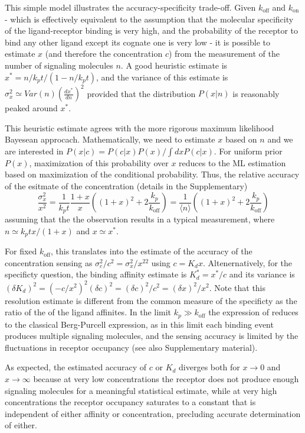 \documentclass[prl,showpacs]{revtex4}
\begin{document}
This simple model illustrates the accuracy-specificity trade-off. Given $k_{\text{off}}$ and $k_{\text{on}}$ - which is effectively equivalent to the assumption that the molecular specificity of the ligand-receptor binding is very high, and the probability of the receptor to bind any other ligand except its cognate one is very low - it is possible to estimate $x$ (and therefore the concentration $c$) from the measurement of the number of signaling molecules $n$.  A good heuristic estimate is $x^*=n/k_pt/(1-n/k_pt)$, and the variance of this estimate is $\sigma^2_x\simeq Var(n)(\frac{dx^*}{dn})^2$ provided that the distribution $P(x|n)$ is reasonably peaked around $x^*$.

This heuristic estimate agrees with the more rigorous maximum likelihood Bayesean approcach. Mathematically, we need to estimate $x$ based on $n$ and we are interested in $P(x|c)=P(c|x)P(x)/\int dx P(c|x)$. For uniform prior $P(x)$, maximization of this probability over $x$ reduces to the ML estimation based on maximization of the conditional probability. Thus, the relative accuracy of the esitmate of the concentration (details in the Supplementary)
%
\begin{equation}
\frac{\sigma^2_x}{x^2}=\frac{1}{k_p t}\frac{1+x}{x}((1+x)^2+2\frac{k_p}{k_{\text{off}}})=\frac{1}{\langle n\rangle}((1+x)^2+2\frac{k_p}{k_{\text{off}}})
\end{equation}\label{delta-x-from-n}
%
assuming that the the observation results in a typical measurement, where $n\simeq k_pt x/(1+x)$ and $x\simeq x^*$.

For fixed $k_{\text{off}}$, this translates into the estimate of the accuracy of the concentration sensing as $\sigma^2_c/c^2=\sigma^2_x/x^22$ using $c=K_d x$. Altenernatively, for the specificty question, the binding affinity estimate is $K_d^*=x^*/c$ and its variance is $(\delta K_d)^2=(-c/x^2)^2(\delta c)^2=(\delta c)^2/c^2=(\delta x)^2/x^2$. Note that this resolution estimate is different from the common measure of the specificty as the ratio of the of the ligand affinites. In the limit $k_p\gg k_{\text{off}}$ the expression of reduces to the classical Berg-Purcell expression, as in this limit each binding event produces multiple signaling molecules, and the sensing accuracy is limited by the fluctuations in receptor occupancy (see also Supplementary material).

As expected, the estimated accuracy of $c$ or $K_d$ diverges both for $x\rightarrow 0$ and $x\rightarrow \infty$ because at very low concentrations the receptor does not produce enough signaling molecules for a meaningful statistical estimate, while at very high concentrations the receptor occupancy saturates to a constant that is independent of either affinity or concentration, precluding accurate determination of either.
\end{document}
